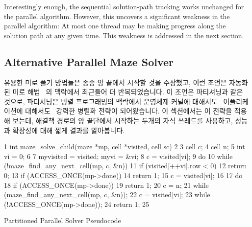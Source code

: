 Interestingly enough, the sequential solution-path tracking works unchanged
for the parallel algorithm.
However, this uncovers a significant weakness in the parallel algorithm:
At most one thread may be making progress along the solution path at
any given time.
This weakness is addressed in the next section.
\fi

\subsection{Alternative Parallel Maze Solver}
\label{sec:SMPdesign:Alternative Parallel Maze Solver}

유용한 미로 풀기 방법들은 종종 양 끝에서 시작할 것을 주장했고, 이런 조언은
자동화된 미로 해법~\cite{UMD:CMSC433maze} 의 맥락에서 최근들어 더
반복되었습니다.
이 조언은 파티셔닝과 같은 것으로, 파티셔닝은 병렬 프로그래밍의 맥락에서
운영체제 커널에 대해서도~\cite{Beck85,Inman85} 어플리케이션에
대해서도~\cite{DavidAPatterson2010TroubleMulticore} 강력한 병렬화 전략이
되어왔습니다.
이 섹션에서는 이 전략을 적용해 보는데, 해결책 경로의 양 끝단에서 시작하는
두개의 자식 쓰레드를 사용하고, 성능과 확장성에 대해 짧게 결과를 알아봅니다.

\begin{listing}[tbp]
{ \scriptsize
\begin{verbbox}
  1 int maze_solve_child(maze *mp, cell *visited, cell sc)
  2 {
  3   cell c;
  4   cell n;
  5   int vi = 0;
  6 
  7   myvisited = visited; myvi = &vi;
  8   c = visited[vi];
  9   do {
 10     while (!maze_find_any_next_cell(mp, c, &n)) {
 11       if (visited[++vi].row < 0)
 12         return 0;
 13       if (ACCESS_ONCE(mp->done))
 14         return 1;
 15       c = visited[vi];
 16     }
 17     do {
 18       if (ACCESS_ONCE(mp->done))
 19         return 1;
 20       c = n;
 21     } while (maze_find_any_next_cell(mp, c, &n));
 22     c = visited[vi];
 23   } while (!ACCESS_ONCE(mp->done));
 24   return 1;
 25 }
\end{verbbox}
}
\centering
\theverbbox
\caption{Partitioned Parallel Solver Pseudocode}
\label{lst:SMPdesign:Partitioned Parallel Solver Pseudocode}
\end{listing}

